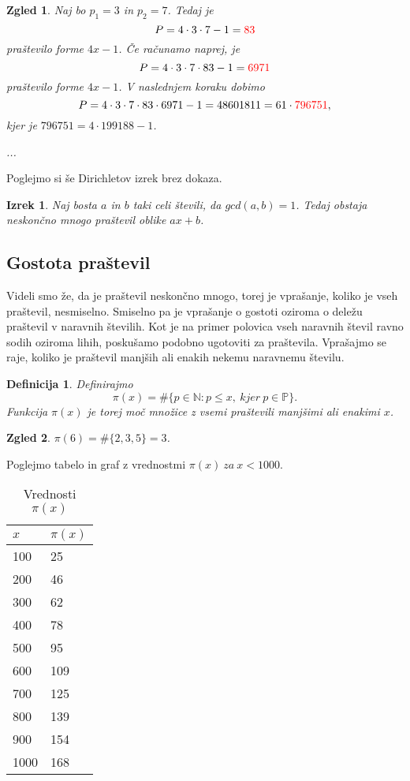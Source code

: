 \documentclass[a4paper,12pt]{article}
\newtheorem{izrek}{Izrek}
\newtheorem{definicija}{Definicija}
\newtheorem{zgled}{Zgled}
\begin{document}
\begin{zgled}
	Naj bo $p_1 = 3$ in $p_2 = 7$. Tedaj je
	$$P = 4 \cdot 3 \cdot 7-1 = \textcolor{red}{83}$$
	praštevilo forme $4x-1$. Če računamo naprej, je
	$$P = 4 \cdot 3 \cdot 7 \cdot 83-1 = \textcolor{red}{6971}$$
	praštevilo forme $4x-1$. V naslednjem koraku dobimo
	$$P = 4 \cdot 3 \cdot 7 \cdot 83 \cdot 6971-1 = 48601811 = 61 \cdot \textcolor{red}{796751},$$
	kjer je $796751 = 4 \cdot 199188-1$.
	\begin{center}
	...
	\end{center}
\end{zgled}	
Poglejmo si še Dirichletov izrek brez dokaza.
\begin{izrek}
	Naj bosta $a$ in $b$ taki celi števili, da $gcd(a, b) = 1$. Tedaj obstaja neskončno
	mnogo praštevil oblike $ax + b$.
\end{izrek}

\subsection{Gostota praštevil}

Videli smo že, da je praštevil neskončno mnogo, torej je vprašanje, koliko je vseh
praštevil, nesmiselno. Smiselno pa je vprašanje o gostoti oziroma o deležu praštevil
v naravnih številih. Kot je na primer polovica vseh naravnih števil ravno
sodih oziroma lihih, poskušamo podobno ugotoviti za praštevila. Vprašajmo se
raje, koliko je praštevil manjših ali enakih nekemu naravnemu številu.

\begin{definicija}
	Definirajmo
	$$\pi(x) = \#\{p \in \mathbb{N}: p \le x, \ kjer \ p \in \mathbb{P} \}.$$
	Funkcija $\pi(x)$ je torej moč množice z vsemi praštevili manjšimi ali enakimi $x$.
\end{definicija}

\begin{zgled}
	$\pi(6) = \#\{2,3,5\}=3$.
\end{zgled}

\noindent Poglejmo tabelo in graf z vrednostmi $\pi(x) \ za \ x < 1000$.

\begin{table}[ht]
	\centering
	\label{my-label}
	\begin{tabular}{|l|l|}
		\hline
		$x$  & $\pi(x)$ \\ \hline
		100  & 25       \\
		200  & 46       \\
		300  & 62       \\
		400  & 78       \\
		500  & 95       \\
		600  & 109      \\
		700  & 125      \\
		800  & 139      \\
		900  & 154      \\
		1000 & 168      \\ \hline
	\end{tabular}
	\caption{Vrednosti $\pi(x)$}
\end{table}
\end{document}
